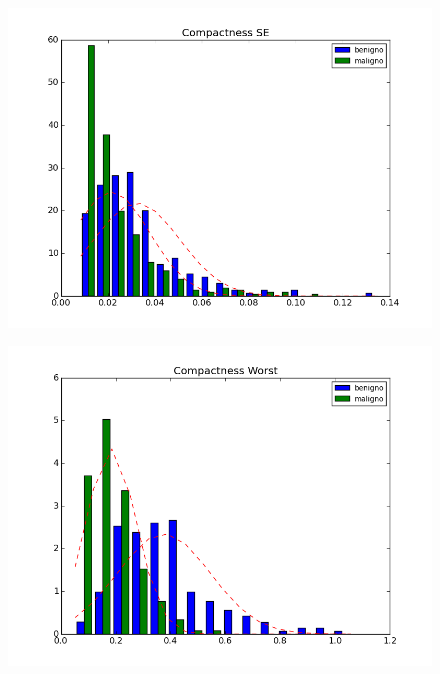 \documentclass[11pt,a4paper]{article}
\numberwithin{equation}{section}
\begin{document}
\begin{itemize}
\begin{figure}[H]
\centering
\begin{minipage}{.5\textwidth}
  \centering
  \includegraphics[width=\linewidth]{../img/hist/compactness_se}
  \label{fig:test1}
\end{minipage}%
\begin{minipage}{.5\textwidth}
  \centering
  \includegraphics[width=\linewidth]{../img/hist/compactness_worst}
  \label{fig:test2}
\end{minipage}
\end{figure}


\end{itemize}
\end{document}
